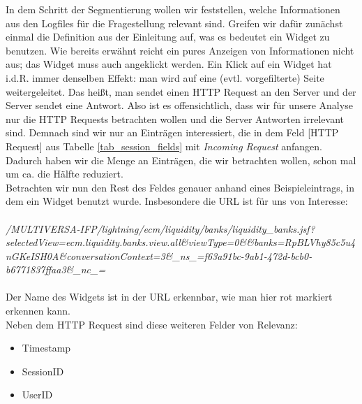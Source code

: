 In dem Schritt der Segmentierung wollen wir feststellen, welche Informationen aus den Logfiles für die Fragestellung relevant sind. Greifen wir dafür zunächst einmal die Definition aus der Einleitung auf, was es bedeutet ein Widget zu benutzen. Wie bereits erwähnt reicht ein pures Anzeigen von Informationen nicht aus; das Widget muss auch angeklickt werden. Ein Klick auf ein Widget hat i.d.R. immer denselben Effekt: man wird auf eine (evtl. vorgefilterte) Seite weitergeleitet. Das heißt, man sendet einen HTTP Request an den Server und der Server sendet eine Antwort. Also ist es offensichtlich, dass wir für unsere Analyse nur die HTTP Requests betrachten wollen und die Server Antworten irrelevant sind. Demnach sind wir nur an Einträgen interessiert, die in dem Feld [HTTP Request] aus Tabelle \ref{tab_session_fields} mit \textit{Incoming Request} anfangen. Dadurch haben wir die Menge an Einträgen, die wir betrachten wollen, schon mal um ca. die Hälfte reduziert.\\
Betrachten wir nun den Rest des Feldes genauer anhand eines Beispieleintrags, in dem ein Widget benutzt wurde. Insbesondere die URL ist für uns von Interesse:\\
\\
\textit{/MULTIVERSA-IFP/lightning/ecm/liquidity/banks/liquidity\_banks.jsf?selectedView=ecm.liquidity.banks.view.all\&viewType=0\&\&banks=RpBLVhy85c5u4nGKeISH0A\&conversationContext=3\&\_ns\_=f63a91bc-9ab1-472d-bcb0-b6771837ffaa3\&\_nc\_=}
\\
\\
Der Name des Widgets ist in der URL erkennbar, wie man hier rot markiert erkennen kann.\\
Neben dem HTTP Request sind diese weiteren Felder von Relevanz:\\
\begin{itemize}
	\item Timestamp
	\item SessionID
	\item UserID
\end{itemize}

